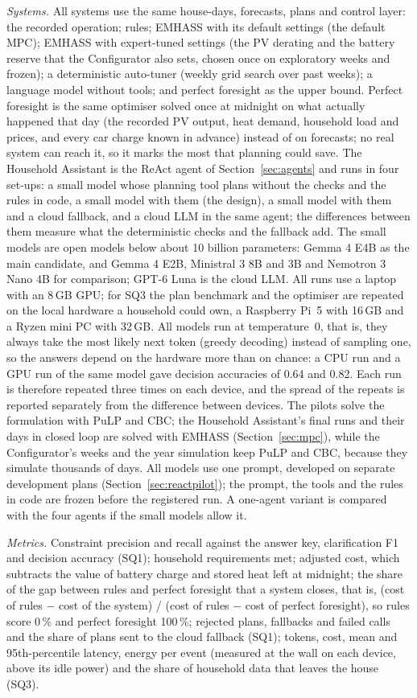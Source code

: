 \textit{Systems.} All systems use the same house-days, forecasts, plans
and control layer: the recorded operation; rules; EMHASS with its
default settings (the default MPC); EMHASS with expert-tuned settings
(the PV derating and the battery reserve that the Configurator also
sets, chosen once on exploratory weeks and frozen); a deterministic auto-tuner (weekly grid search over past weeks);
a language model without tools; and perfect foresight as the upper
bound. Perfect foresight is the same optimiser solved once at midnight
on what actually happened that day (the recorded PV output, heat
demand, household load and prices, and every car charge known in
advance) instead of on forecasts; no real system can reach it, so it
marks the most that planning could save. The Household Assistant is the ReAct agent of
Section~\ref{sec:agents} and runs in four set-ups: a small model whose
planning tool plans without the checks and the rules in code, a small
model with them (the design), a small model with them and a cloud
fallback, and a cloud LLM in the same agent; the differences between
them measure what the deterministic checks and the fallback add. The
small models are open models below about 10 billion parameters: Gemma 4
E4B as the main candidate, and Gemma 4 E2B, Ministral 3 8B and 3B and
Nemotron 3 Nano 4B for comparison; GPT-6 Luna is the cloud LLM. All
runs use a laptop with an 8\,GB GPU; for SQ3 the plan benchmark and the
optimiser are repeated on the local hardware a household could own, a
Raspberry Pi~5 with 16\,GB and a Ryzen mini PC with 32\,GB. All models
run at temperature~0, that is, they always take the most likely next
token (greedy decoding) instead of sampling one, so the answers depend
on the hardware more than on chance: a CPU run and a GPU run of the same model gave decision
accuracies of 0.64 and 0.82. Each run is therefore repeated three times
on each device, and the spread of the repeats is reported separately
from the difference between devices. The pilots solve the formulation
with PuLP and CBC; the Household Assistant's final runs and their days
in closed loop are solved with EMHASS (Section~\ref{sec:mpc}), while
the Configurator's weeks and the year simulation keep PuLP and CBC,
because they simulate thousands of days. All models use one prompt, developed on separate development
plans (Section~\ref{sec:reactpilot}); the prompt, the tools and the
rules in code are frozen before the registered run. A one-agent variant is compared
with the four agents if the small models allow it.

\textit{Metrics.} Constraint precision and recall against the answer
key, clarification F1 and decision accuracy (SQ1); household
requirements met; adjusted cost, which subtracts the value of battery
charge and stored heat left at midnight; the share of the gap between
rules and perfect foresight that a system closes, that is, (cost of
rules $-$ cost of the system) / (cost of rules $-$ cost of perfect
foresight), so rules score 0\,\% and perfect foresight 100\,\%; rejected plans,
fallbacks and failed calls and the share of plans sent to the cloud
fallback (SQ1); tokens, cost, mean and 95th-percentile latency, energy
per event (measured at the wall on each device, above its idle power)
and the share of household data that leaves the house (SQ3).

